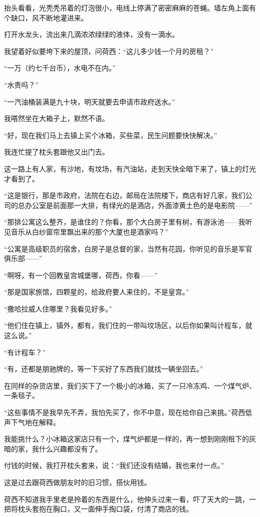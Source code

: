 \par 抬头看看，光秃秃吊着的灯泡很小，电线上停满了密密麻麻的苍蝇。墙左角上面有个缺口，风不断地灌进来。
\par 打开水龙头，流出来几滴浓浓绿绿的液体，没有一滴水。
\par 我望着好似要垮下来的屋顶，问荷西：“这儿多少钱一个月的房租？”
\par “一万（约七千台币），水电不在内。”
\par “水贵吗？”
\par “一汽油桶装满是九十块，明天就要去申请市政府送水。”
\par 我嗒然坐在大箱子上，默然不语。
\par “好，现在我们马上去镇上买个冰箱，买些菜，民生问题要快快解决。”
\par 我连忙提了枕头套跟他又出门去。
\par 这一路上有人家，有沙地，有坟场，有汽油站，走到天快全暗下来了，镇上的灯光才看到了。
\par “这是银行，那是市政府，法院在右边，邮局在法院楼下，商店有好几家，我们公司的总办公室是前面那一大排，有绿光的是酒店，外面漆黄土色的是电影院——”
\par “那排公寓这么整齐，是谁住的？你看，那个大白房子里有树，有游泳池——我听见音乐从白纱窗帘里飘出来的那个大厦也是酒家吗？”
\par “公寓是高级职员的宿舍，白房子是总督的家，当然有花园，你听见的音乐是军官俱乐部——”
\par “啊呀，有一个回教皇宫城堡哪，荷西，你看——”
\par “那是国家旅馆，四颗星的，给政府要人来住的，不是皇宫。”
\par “撒哈拉威人住哪里？我看见好多。”
\par “他们住在镇上，镇外，都有，我们住的一带叫坟场区，以后你如果叫计程车，就这么说。”
\par “有计程车？”
\par “有，还都是朋驰牌的，等一下买好了东西我们就找一辆坐回去。”
\par 在同样的杂货店里，我们买下了一个极小的冰箱，买了一只冷冻鸡、一个煤气炉、一条毯子。
\par “这些事情不是我早先不弄，我怕先买了，你不中意，现在给你自己来挑。”荷西低声下气地在解释。
\par 我能挑什么？小冰箱这家店只有一个，煤气炉都是一样的，再一想到刚刚租下的灰暗的家，我什么兴趣都没有了。
\par 付钱的时候，我打开枕头套来，说：“我们还没有结婚，我也来付一点。”
\par 这是过去跟荷西做朋友时的旧习惯，搭伙用钱。
\par 荷西不知道我手里老是拎着的东西是什么，他伸头过来一看，吓了天大的一跳，一把将枕头套抱在胸口，又一面伸手掏口袋，付清了商店的钱。
